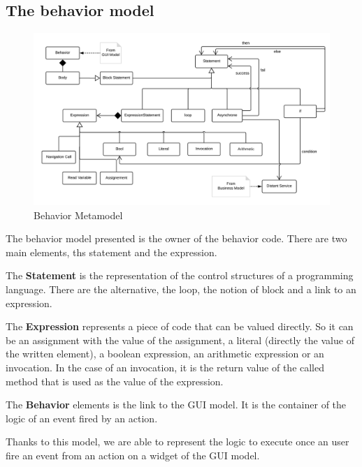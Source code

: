 \documentclass[conference]{IEEEtran}
\begin{document}
\subsection{The behavior model}
\label{sec:behaviorModel}
    

\begin{figure}
    \includegraphics[width=\linewidth]{figures/BehaviorModel.png}
    \caption{Behavior Metamodel}
    \label{fig:behaviorModel}
\end{figure}

The behavior model presented  is the owner of
    the behavior code.
There are two main elements, ths statement and the expression.

The \textbf{Statement} is the representation of the control structures of
    a programming language.
There are the alternative, the loop, the notion of block and a link to an expression.

The \textbf{Expression} represents a piece of code that can be valued directly.
So it can be an assignment with the value of the assignment,
    a literal (\ie directly the value of the written element),
    a boolean expression, 
    an arithmetic expression
    or an invocation.
In the case of an invocation, it is the return value of the called method that
    is used as the value of the expression.

The \textbf{Behavior} elements is the link to the GUI model.
It is the container of the logic of an event fired by an action.

Thanks to this model, we are able to represent the logic to execute once an user
    fire an event from an action on a widget of the GUI model.
\end{document}
